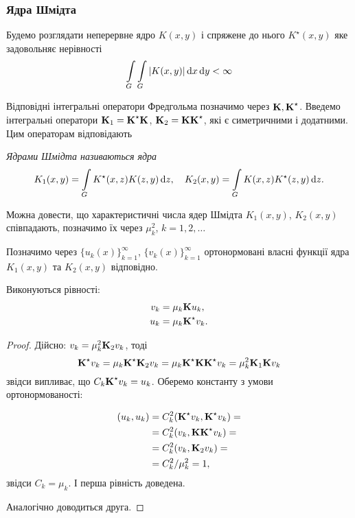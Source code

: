 \subsubsection{Ядра Шмідта}

Будемо розглядати неперервне ядро $K(x, y)$ і спряжене до нього $K^\star (x,y)$ яке задовольняє нерівності
\begin{equation}
	\Int_G\Int_G|K(x,y)|\diff x\diff y<\infty
\end{equation}

Відповідні інтегральні оператори Фредгольма позначимо через $\bf{K}, \bf{K}^\star $. Введемо інтегральні оператори $\bf{K}_1=\bf{K}^\star \bf{K}$, $\bf{K}_2=\bf{K}\bf{K}^\star $, які є симетричними і додатними. Цим операторам відповідають 

\begin{definition}
	\it{Ядрами Шмідта} називаються ядра
	\begin{equation}
		K_1(x, y) = \Int_G K^\star (x, z) K(z, y) \diff z, \quad K_2(x, y) = \Int_G K(x, z) K^\star (z, y) \diff z.
	\end{equation}
\end{definition}

Можна довести, що характеристичні числа ядер Шмідта $K_1(x, y)$, $K_2(x, y)$ співпадають, позначимо їх через $\mu_k^2$, $k=1,2,\ldots$ \medskip

Позначимо через $\{u_k(x)\}_{k=1}^\infty$, $\{v_k(x)\}_{k=1}^\infty$ ортонормовані власні функції ядра $K_1(x,y)$ та $K_2(x,y)$ відповідно. \medskip

\begin{proposition}
	\label{proposition:2.6.3}
	Виконуються рівності:
	\begin{align}
		v_k&=\mu_k\bf{K}u_k, \\
		u_k&=\mu_k\bf{K}^\star v_k.
	\end{align}
\end{proposition}

\begin{proof}
	Дійсно: $v_k=\mu_k^2\bf{K}_2v_k$, тоді
	\begin{equation}
		\bf{K}^\star v_k=\mu_k\bf{K}^\star \bf{K}_2v_k=\mu_k\bf{K}^\star \bf{K}\bf{K}^\star v_k=\mu_k^2\bf{K}_1\bf{K}v_k
	\end{equation}
	звідси випливає, що $C_k\bf{K}^\star v_k=u_k$. Оберемо константу з умови ортонормованості:

	\begin{equation}
		\begin{aligned}
		(u_k, u_k) &= C_k^2 (\bf{K}^\star v_k, \bf{K}^\star v_k)=\\
		&=C_k^2(v_k,\bf{K}\bf{K}^\star v_k)=\\
		&=C_k^2(v_k,\bf{K}_2v_k)=\\\
		&=C_k^2/\mu_k^2=1,
		\end{aligned}
	\end{equation}
	звідси $C_k = \mu_k$. І перша рівність доведена. \medskip

	Аналогічно доводиться друга.
\end{proof}

